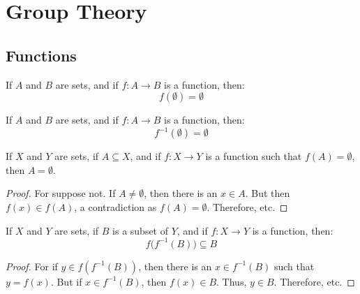 \chapter{Group Theory}
    \section{Functions}
        \begin{theorem}
            \label{theorem:Set_Theory_Image_of_Empty_Set_Is_Empty}
            If $A$ and $B$ are sets, and if $f:A\rightarrow{B}$
            is a function, then:
            \begin{equation}
                f(\emptyset)=\emptyset
            \end{equation}
        \end{theorem}
        \begin{theorem}
            If $A$ and $B$ are sets, and if $f:A\rightarrow{B}$ is a function, then:
            \begin{equation}
                f^{-1}(\emptyset)=\emptyset
            \end{equation}
        \end{theorem}
        \begin{theorem}
            If $X$ and $Y$ are sets, if $A\subseteq{X}$, and if
            $f:X\rightarrow{Y}$ is a function such that
            $f(A)=\emptyset$, then $A=\emptyset$.
        \end{theorem}
        \begin{proof}
            For suppose not. If $A\ne\emptyset$, then there is an
            $x\in{A}$. But then $f(x)\in{f}(A)$, a contradiction as
            $f(A)=\emptyset$. Therefore, etc.
        \end{proof}
        \begin{theorem}
            If $X$ and $Y$ are sets, if $B$ is a subset of $Y$,
            and if $f:X\rightarrow{Y}$ is a function, then:
            \begin{equation}
                f\big(f^{-1}(B)\big)\subseteq{B}
            \end{equation}
        \end{theorem}
        \begin{proof}
            For if $y\in{f(f^{-1}(B))}$, then there is an
            $x\in{f^{-1}(B)}$ such that $y=f(x)$. But if
            $x\in{f^{-1}(B)}$, then $f(x)\in{B}$. Thus,
            $y\in{B}$. Therefore, etc.
        \end{proof}
